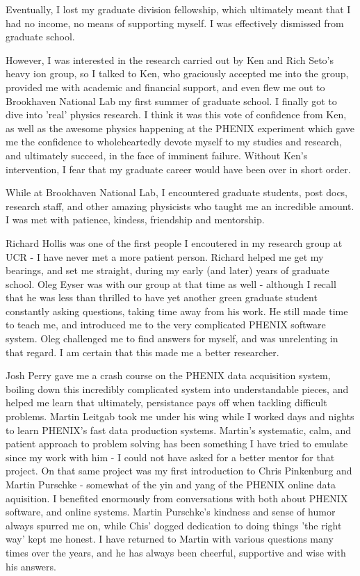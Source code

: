 Eventually, I lost my graduate division fellowship, which ultimately meant that
I had no income, no means of supporting myself. I was effectively dismissed from
graduate school. 

However, I was interested in the research carried out by Ken and Rich Seto's
heavy ion group, so I talked to Ken, who graciously accepted me into the group,
provided me with academic and financial support, and even flew me out to
Brookhaven National Lab my first summer of graduate school. I finally got to
dive into 'real' physics research. I think it was this vote of confidence from
Ken, as well as the awesome physics happening at the PHENIX experiment which
gave me the confidence to wholeheartedly devote myself to my studies and
research, and ultimately succeed, in the face of imminent failure. Without Ken's
intervention, I fear that my graduate career would have been over in short
order.

While at Brookhaven National Lab, I encountered graduate students, post docs,
research staff, and other amazing physicists who taught me an incredible
amount. I was met with patience, kindess, friendship and mentorship.

Richard Hollis was one of the first people I encoutered in my research group at
UCR - I have never met a more patient person. Richard helped me get my bearings,
and set me straight, during my early (and later) years of graduate school. Oleg
Eyser was with our group at that time as well - although I recall that he was
less than thrilled to have yet another green graduate student constantly asking
questions, taking time away from his work. He still made time to teach me, and
introduced me to the very complicated PHENIX software system.  Oleg challenged
me to find answers for myself, and was unrelenting in that regard. I am certain
that this made me a better researcher.

Josh Perry gave me a crash course on the PHENIX data acquisition system,
boiling down this incredibly complicated system into understandable pieces, and
helped me learn that ultimately, persistance pays off when tackling difficult
problems. Martin Leitgab took me under his wing while I worked days and nights
to learn PHENIX's fast data production systems. Martin's systematic, calm, and
patient approach to problem solving has been something I have tried to emulate
since my work with him - I could not have asked for a better mentor for that
project. On that same project was my first introduction to Chris Pinkenburg and
Martin Purschke - somewhat of the yin and yang of the PHENIX online data
aquisition. I benefited enormously from conversations with both about PHENIX
software, and online systems. Martin Purschke's kindness and sense of humor
always spurred me on, while Chis' dogged dedication to doing things 'the right
way' kept me honest. I have returned to Martin with various questions many
times over the years, and he has always been cheerful, supportive and wise with
his answers. 

